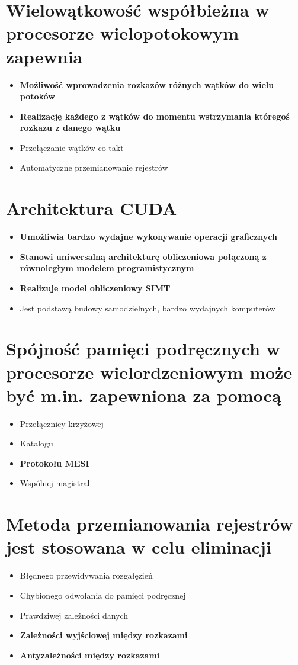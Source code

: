 \documentclass[a4paper,twoside]{article}
\begin{document}
\section{Wielowątkowość współbieżna w procesorze wielopotokowym zapewnia}
	\begin{itemize}
    \item \textbf{Możliwość wprowadzenia rozkazów różnych wątków do wielu potoków}
    \item \textbf{Realizację każdego z wątków do momentu wstrzymania któregoś rozkazu z danego wątku}
    \item Przełączanie wątków co takt
    \item Automatyczne przemianowanie rejestrów
    \end{itemize}

\section{Architektura CUDA}
	\begin{itemize}
    \item \textbf{Umożliwia bardzo wydajne wykonywanie operacji graficznych}
    \item \textbf{Stanowi uniwersalną architekturę obliczeniowa połączoną z równoległym modelem programistycznym}
    \item \textbf{Realizuje model obliczeniowy SIMT}
    \item Jest podstawą budowy samodzielnych, bardzo wydajnych komputerów
    \end{itemize}

\section{Spójność pamięci podręcznych w procesorze wielordzeniowym może być m.in. zapewniona za pomocą}
	\begin{itemize}
    \item Przełącznicy krzyżowej
    \item Katalogu
    \item \textbf{Protokołu MESI}
    \item Wspólnej magistrali
    \end{itemize}

\section{Metoda przemianowania rejestrów jest stosowana w celu eliminacji}
	\begin{itemize}
    \item Błędnego przewidywania rozgałęzień
    \item Chybionego odwołania do pamięci podręcznej
    \item Prawdziwej zależności danych
    \item \textbf{Zależności wyjściowej między rozkazami}
    \item \textbf{Antyzależności między rozkazami}
    \end{itemize}
\end{document}
